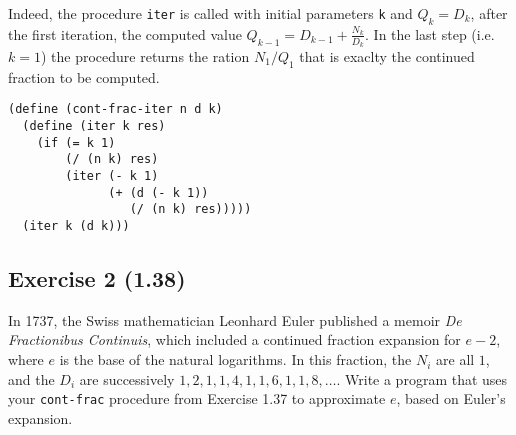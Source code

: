 \begin{itemize}
        Indeed, the procedure \texttt{iter} is called with initial parameters \texttt{k} and $ Q_{k} = D_{k} $, after the first 
        iteration, the computed value $ Q_{k - 1} = D_{k - 1} + \frac{N_{k}}{D_{k}} $.
        In the last step (i.e. $ k = 1 $) the procedure returns the ration $ N_{1} / Q_{1} $ that is exaclty the continued fraction
        to be computed.
\begin{lstlisting}
(define (cont-frac-iter n d k)
  (define (iter k res)
    (if (= k 1)
        (/ (n k) res)
        (iter (- k 1)
              (+ (d (- k 1))
                 (/ (n k) res)))))
  (iter k (d k)))
\end{lstlisting}   
\end{itemize}


\subsection*{Exercise 2 (1.38)}
In 1737, the Swiss mathematician Leonhard Euler published a memoir \textit{De Fractionibus Continuis}, which
included a continued fraction expansion for $ e - 2 $, where $ e $ is the base of the natural logarithms.
In this fraction, the $ N_{i} $ are all $ 1 $, and the $ D_{i} $ are successively $ 1, 2, 1, 1, 4, 1, 1, 6, 1, 1, 8, \dots $.
Write a program that uses your \texttt{cont-frac} procedure from Exercise 1.37 to approximate $ e $, based on Euler's expansion.

